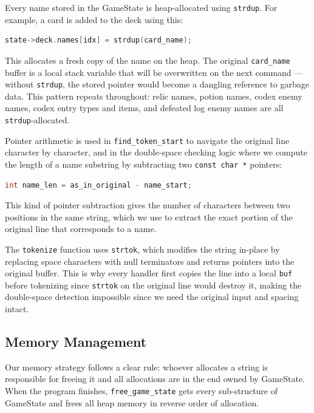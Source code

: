 \documentclass[12pt,a4paper]{article}
\begin{document}
Every name stored in the GameState is heap-allocated using \texttt{strdup}. For example, a card is added to the deck using this:

\begin{lstlisting}[language=C]
state->deck.names[idx] = strdup(card_name);
\end{lstlisting}

This allocates a fresh copy of the name on the heap. The original \texttt{card\_name} buffer is a local stack variable that will be overwritten on the next command --- without \texttt{strdup}, the stored pointer would become a dangling reference to garbage data. This pattern repeats throughout: relic names, potion names, codex enemy names, codex entry types and items, and defeated log enemy names are all \texttt{strdup}-allocated.

Pointer arithmetic is used in \texttt{find\_token\_start} to navigate the original line character by character, and in the double-space checking logic where we compute the length of a name substring by subtracting two \texttt{const char *} pointers:

\begin{lstlisting}[language=C]
int name_len = as_in_original - name_start;
\end{lstlisting}

This kind of pointer subtraction gives the number of characters between two positions in the same string, which we use to extract the exact portion of the original line that corresponds to a name.

The \texttt{tokenize} function uses \texttt{strtok}, which modifies the string in-place by replacing space characters with null terminators and returns pointers into the original buffer. This is why every handler first copies the line into a local \texttt{buf} before tokenizing since \texttt{strtok} on the original line would destroy it, making the double-space detection impossible since we need the original input and spacing intact.

\subsection{Memory Management}

Our memory strategy follows a clear rule: whoever allocates a string is responsible for freeing it and all allocations are in the end owned by GameState. When the program finishes, \texttt{free\_game\_state} gets every sub-structure of GameState and frees all heap memory in reverse order of allocation.
\end{document}
